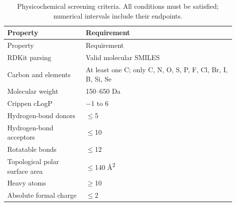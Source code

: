 \begingroup
\setlength{\tabcolsep}{3pt}
\renewcommand{\arraystretch}{1.15}
\footnotesize
\begin{longtable}{@{}p{0.32\linewidth}p{0.61\linewidth}@{}}
\caption{Physicochemical screening criteria. All conditions must be satisfied; numerical intervals include their endpoints.}\label{tab:plinder23-screen}\\
\toprule
Property & Requirement\\
\midrule
\endfirsthead
\toprule
Property & Requirement\\
\midrule
\endhead
\bottomrule
\endfoot
RDKit parsing & Valid molecular SMILES\\
Carbon and elements & At least one C; only C, N, O, S, P, F, Cl, Br, I, B, Si, Se\\
Molecular weight & 150--650 Da\\
Crippen cLogP & $-$1 to 6\\
Hydrogen-bond donors & $\leq$5\\
Hydrogen-bond acceptors & $\leq$10\\
Rotatable bonds & $\leq$12\\
Topological polar surface area & $\leq$140 \AA{}\textsuperscript{2}\\
Heavy atoms & $\geq$10\\
Absolute formal charge & $\leq$2\\
\end{longtable}
\endgroup
